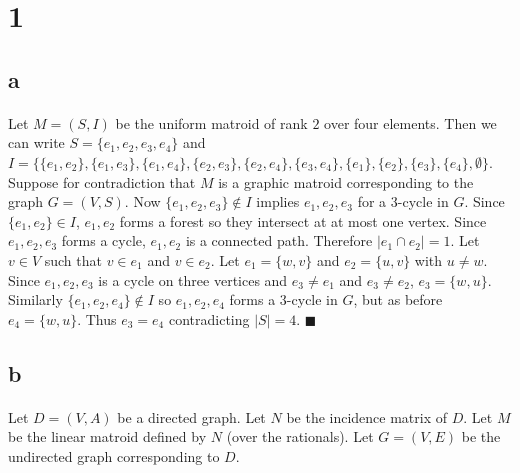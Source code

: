 \documentclass[letterpaper,12pt,oneside,onecolumn]{report}
\begin{document}
\section*{1}
\subsection*{a}
\paragraph{}
Let $M = (S,I)$ be the uniform matroid of rank $2$ over four elements. Then we can write $S = \{e_1, e_2, e_3, e_4\}$ and $I = \{\{e_1, e_2\}, \{e_1, e_3\}, \{e_1,e_4\},\{e_2,e_3\}, \{e_2,e_4\}, \{e_3,e_4\}, \{e_1\}, \{e_2\}, \{e_3\}, \{e_4\}, \emptyset\}$. Suppose for contradiction that $M$ is a graphic matroid corresponding to the graph $G = (V, S)$. Now $\{e_1,e_2,e_3\} \not\in I$ implies $e_1, e_2,e_3$ for a $3$-cycle in $G$. Since $\{e_1, e_2\} \in I$, $e_1,e_2$ forms a forest so they intersect at at most one vertex. Since $e_1,e_2,e_3$ forms a cycle, $e_1,e_2$ is a connected path. Therefore $|e_1 \cap e_2| = 1$. Let $v \in V$ such that $v \in e_1$ and $v \in e_2$. Let $e_1 = \{w,v\}$ and $e_2 = \{u,v\}$ with $u \neq w$. Since $e_1,e_2,e_3$ is a cycle on three vertices and $e_3 \neq e_1$ and $e_3 \neq e_2$, $e_3 = \{w,u\}$. Similarly $\{e_1,e_2,e_4\} \not\in I$ so $e_1,e_2,e_4$ forms a $3$-cycle in $G$, but as before $e_4 = \{w,u\}$. Thus $e_3 = e_4$ contradicting $|S| = 4$. $\blacksquare$
\subsection*{b}
\paragraph{}
Let $D = (V,A)$ be a directed graph. Let $N$ be the incidence matrix of $D$. Let $M$ be the linear matroid defined by $N$ (over the rationals). Let $G = (V,E)$ be the undirected graph corresponding to $D$.
\end{document}

